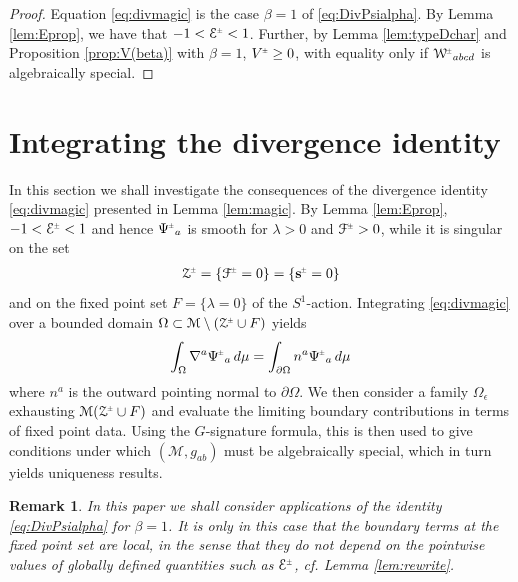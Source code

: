 \documentclass[a4paper,10pt,reqno]{amsart}
\newcommand{\cE}{\mathcal{E}}
\newcommand{\cZ}{\mathcal{Z}}
\newcommand{\cM}{\mathcal{M}}
\theoremstyle{plain}
\newtheorem{remark}[thm]{Remark}
\newcommand{\PM}[1]{{{#1}^{\hspace{-.5pt}\scaleto{\pm}{3.5pt}}}}
\def\Wcal{\mathcal{W}}
\def\Fcal{\mathcal{F}}
\def\sbold{\mathbf{s}}
\numberwithin{equation}{section}
\newcommand{\eps}{\epsilon}
\newcommand{\Fixed}{F}
\begin{document}
\begin{proof} 
Equation \eqref{eq:divmagic} is the case $\beta=1$ of 
\eqref{eq:DivPsialpha}. By Lemma \ref{lem:Eprop}, we have that $-1 < \PM{\cE} < 1$. Further, by Lemma \ref{lem:typeDchar} and Proposition \ref{prop:V(beta)} with $\beta=1$, $\PM{V} \geq 0$, with equality only if $\PM{\Wcal}_{abcd}$ is algebraically special. 
\end{proof} 
 



\section{Integrating the divergence identity} 
\label{sec:int}

In this section we shall investigate the consequences of the divergence identity \eqref{eq:divmagic} presented in Lemma \ref{lem:magic}. 
%
%
%
%
%
%
%
By Lemma \ref{lem:Eprop}, $-1 < \PM{\cE} < 1$ and hence 
$\PM{\Psi}_a$ is smooth for $\lambda > 0$ and $\PM{\Fcal} > 0$, while it is singular on the set
\begin{align} \label{eq:cZdef}
\PM{\cZ} = \{\PM{\Fcal} = 0\} = \{\PM{\sbold} = 0\}
\end{align}
and on the fixed point set $\Fixed = \{\lambda = 0\}$ of the $S^1$-action. Integrating \eqref{eq:divmagic} over a bounded domain  $\Omega \subset \cM \setminus (\PM{\cZ} \cup \Fixed)$ 
yields 
\begin{align} \label{eq:magic-boundary} 
\int_\Omega \nabla^a \PM{\Psi}_a \, d\mu
= \int_{\partial \Omega} n^a \PM{\Psi}_a \, d\mu
\end{align} 
where $n^a$ is the outward pointing normal to $\partial \Omega$. We then consider a family $\Omega_\eps$ exhausting $\cM (\PM{\cZ} \cup \Fixed)$ and evaluate the limiting boundary contributions in terms of fixed point data. Using the $G$-signature formula, this is then used to give conditions under which  $(\cM, g_{ab})$ must be algebraically special, which in turn yields uniqueness results. 
%


\begin{remark} \label{rem:beta}
In this paper we shall consider applications of the identity \eqref{eq:DivPsialpha} for $\beta=1$. It is only in this case that the boundary terms at the fixed point set are local, in the sense that they do not depend on the pointwise values of globally defined quantities such as $\PM{\cE}$, cf. Lemma \ref{lem:rewrite}. 
%
\end{remark} 
\end{document}
